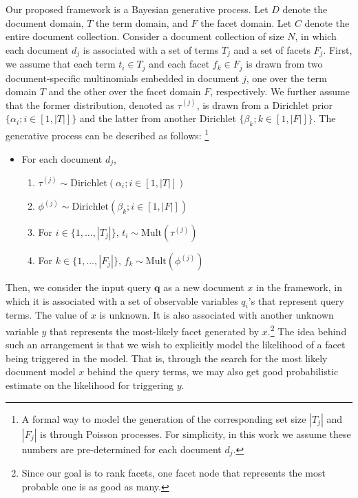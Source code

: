 Our proposed framework is a Bayesian generative process.  Let $D$ denote the document
domain, $T$ the term domain, and $F$ the facet domain.  Let $C$ denote the
entire document collection.  Consider a document collection of size $N$, in
which each document $d_j$ is associated with a set of terms $T_j$ and a set of
facets $F_j$.  First, we assume that each term $t_i \in T_j$ and each facet
$f_k \in F_j$ is drawn from two document-specific multinomials embedded
in document $j$, one over the term domain $T$ and the other over the facet domain $F$,
respectively.  We further assume that the former distribution, denoted as
$\tau^{(j)}$, is drawn from a Dirichlet prior $\{ \alpha_i; i \in [1, |T|] \}$
and the latter from another Dirichlet $\{ \beta_k; k \in [1, |F|] \}$.  The
generative process can be described as follows: \footnote{A formal way to model
the generation of the corresponding set size $|T_j|$ and $|F_j|$ is through
Poisson processes.  For simplicity, in this work we assume these numbers are
pre-determined for each document $d_j$.} 

\begin{itemize} 
  \item For each document $d_j$, \begin{enumerate}
    \item $\tau^{(j)} \sim \textrm{Dirichlet}(\alpha_i; i \in [1, |T|])$
    \item $\phi^{(j)} \sim \textrm{Dirichlet}(\beta_k; i \in [1, |F|])$
    \item For $i \in \{ 1, \ldots, |T_j| \}$, $t_i \sim \textrm{Mult}(\tau^{(j)})$ 
    \item For $k \in \{ 1, \ldots, |F_j| \}$, $f_k \sim \textrm{Mult}(\phi^{(j)})$ 
  \end{enumerate}
\end{itemize}

Then, we consider the input query $\mathbf{q}$ as a new document $x$ in the
framework, in which it is associated with a set of observable variables $q_i$'s that represent
query terms.  The value of $x$ is unknown.  It is also associated
with another unknown variable $y$ that represents the most-likely facet generated by
$x$.\footnote{Since our goal is to rank facets, one facet node that represents the most
probable one is as good as many.} The idea behind such an arrangement is that
we wish to explicitly model the likelihood of a facet being triggered in the
model.  That is, through the search for the most likely document model $x$
behind the query terms, we may also get good probabilistic estimate on the
likelihood for triggering $y$.

